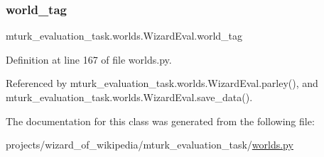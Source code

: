 \mbox{\label{classmturk__evaluation__task_1_1worlds_1_1WizardEval_a159f57b257cf77486953e1bb98639b72}} 
\subsubsection{\texorpdfstring{world\+\_\+tag}{world\_tag}}
{\footnotesize\ttfamily mturk\+\_\+evaluation\+\_\+task.\+worlds.\+Wizard\+Eval.\+world\+\_\+tag}



Definition at line 167 of file worlds.\+py.



Referenced by mturk\+\_\+evaluation\+\_\+task.\+worlds.\+Wizard\+Eval.\+parley(), and mturk\+\_\+evaluation\+\_\+task.\+worlds.\+Wizard\+Eval.\+save\+\_\+data().



The documentation for this class was generated from the following file\+:\begin{DoxyCompactItemize}
\item 
projects/wizard\+\_\+of\+\_\+wikipedia/mturk\+\_\+evaluation\+\_\+task/\hyperlink{projects_2wizard__of__wikipedia_2mturk__evaluation__task_2worlds_8py}{worlds.\+py}\end{DoxyCompactItemize}

